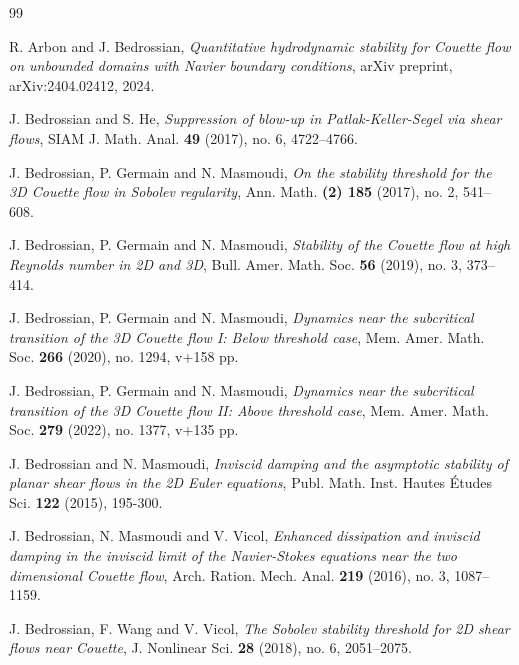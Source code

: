 \documentclass[reqno, 12pt]{amsart} %
\theoremstyle{plain} %
\theoremstyle{definition}
\theoremstyle{remark}
\numberwithin{equation}{section} %
\begin{document}
    
	\begin{thebibliography}{99}
		

        
		  R. Arbon and J. Bedrossian, \textit{Quantitative hydrodynamic stability for Couette flow on unbounded domains with Navier boundary conditions}, arXiv preprint, arXiv:2404.02412, 2024.

        
		J. Bedrossian and S. He, 
		\textit{Suppression of blow-up in Patlak-Keller-Segel via shear flows}, 
		SIAM J. Math. Anal. \textbf{49} (2017), no. 6, 4722–4766.
		
		J. Bedrossian, P. Germain and N. Masmoudi, 
		\textit{On the stability threshold for the 3D Couette flow in Sobolev regularity}, 
		Ann. Math. \textbf{(2) 185} (2017), no. 2, 541–608.
		
		J. Bedrossian, P. Germain and N. Masmoudi, 
		\textit{Stability of the Couette flow at high Reynolds number in 2D and 3D}, 
		Bull. Amer. Math. Soc. \textbf{56} (2019), no. 3, 373–414. 
		
		J. Bedrossian, P. Germain and N. Masmoudi, 
		\textit{Dynamics near the subcritical transition of the 3D Couette flow I: Below threshold case}, 
		Mem. Amer. Math. Soc. \textbf{266} (2020), no. 1294, v+158 pp.
		
		J. Bedrossian, P. Germain and N. Masmoudi, 
		\textit{Dynamics near the subcritical transition of the 3D Couette flow II: Above threshold case}, 
		Mem. Amer. Math. Soc. \textbf{279} (2022), no. 1377, v+135 pp.
		
		J. Bedrossian and N. Masmoudi, 
		\textit{Inviscid damping and the asymptotic stability of planar shear flows in the 2D Euler equations}, 
		Publ. Math. Inst. Hautes Études Sci. \textbf{122} (2015), 195-300.
		
		J. Bedrossian, N. Masmoudi and V. Vicol, 
		\textit{Enhanced dissipation and inviscid damping in the inviscid limit of the Navier-Stokes equations near the two dimensional Couette flow}, 
		Arch. Ration. Mech. Anal. \textbf{219} (2016), no. 3, 1087–1159.
		
		J. Bedrossian, F. Wang and V. Vicol, 
		\textit{The Sobolev stability threshold for 2D shear flows near Couette}, 
		J. Nonlinear Sci. \textbf{28} (2018), no. 6, 2051–2075.
		

\end{thebibliography}
\end{document}

